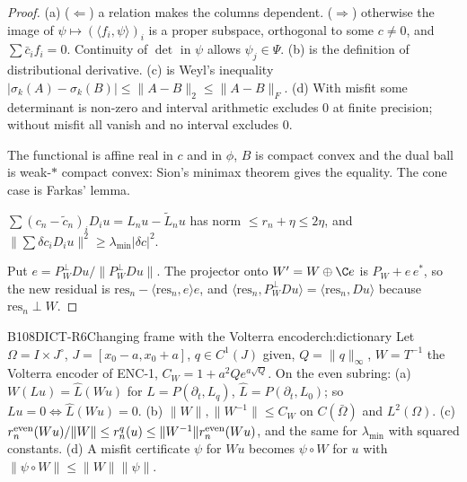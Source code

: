 \begin{proof}
(a) ($\Leftarrow$) a relation makes the columns dependent. ($\Rightarrow$) otherwise the image of $\psi\mapsto(\langle f_i,\psi\rangle)_i$ is a proper subspace, orthogonal to some $c\ne0$, and $\sum\bar c_if_i=0$. Continuity of $\det$ in $\psi$ allows $\psi_j\in\Psi$. (b) is the definition of distributional derivative. (c) is Weyl's inequality $|\sigma_k(A)-\sigma_k(B)|\le\|A-B\|_2\le\|A-B\|_F$. (d) With misfit some determinant is non-zero and interval arithmetic excludes $0$ at finite precision; without misfit all vanish and no interval excludes $0$.

The functional is affine real in $c$ and in $\phi$, $B$ is compact convex and the dual ball is weak-$*$ compact convex: Sion's minimax theorem gives the equality. The cone case is Farkas' lemma.

$\sum(c_n-\tilde c_n)_iD_iu=L_nu-\tilde L_nu$ has norm $\le r_n+\eta\le2\eta$, and $\|\sum\delta c_iD_iu\|^2\ge\lambda_{\min}|\delta c|^2$.

Put $e=P_W^\perp Du/\|P_W^\perp Du\|$. The projector onto $W'=W\oplus\C e$ is $P_W+e\,e^*$, so the new residual is $\mathrm{res}_n-\langle\mathrm{res}_n,e\rangle e$, and $\langle\mathrm{res}_n,P_W^\perp Du\rangle=\langle\mathrm{res}_n,Du\rangle$ because $\mathrm{res}_n\perp W$.

\end{proof}

\begin{dimcard}{B108}{DICT-R6}{Changing frame with the Volterra encoder}{\pw}{ch:dictionary}
Let $\Omega=I\times J^\circ$, $J=[x_0-a,x_0+a]$, $q\in C^1(J)$ given, $Q=\|q\|_\infty$, $W=T^{-1}$ the Volterra encoder of ENC-1, $C_W=1+a^2Qe^{a\sqrt Q}$. On the even subring: (a) $W(Lu)=\hat L(Wu)$ for $L=P(\partial_t,L_q)$, $\hat L=P(\partial_t,L_0)$; so $Lu=0\iff\hat L(Wu)=0$. (b) $\|W\|,\|W^{-1}\|\le C_W$ on $C(\bar\Omega)$ and $L^2(\Omega)$. (c) $r^{\rm even}_n(Wu)/\|W\|\le r^q_n(u)\le\|W^{-1}\|r^{\rm even}_n(Wu)$, and the same for $\lambda_{\min}$ with squared constants. (d) A misfit certificate $\psi$ for $Wu$ becomes $\psi\circ W$ for $u$ with $\|\psi\circ W\|\le\|W\|\|\psi\|$.
\end{dimcard}


